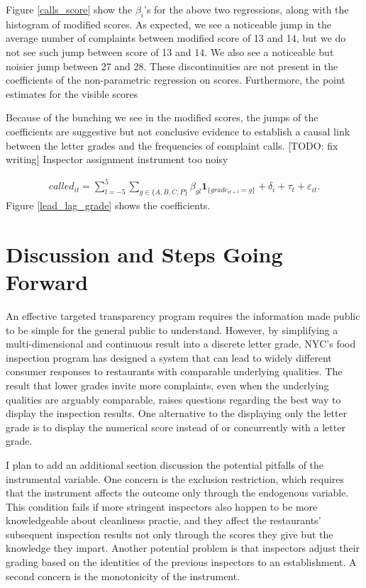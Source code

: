 \documentclass[11pt]{article}
\begin{document}
Figure \ref{calls_score} show the $\beta_i$'s for the above two regressions, along with the histogram of modified scores. As expected, we see a noticeable jump in the average number of complaints between modified score of 13 and 14, but we do not see such jump between score of 13 and 14. We also see a noticeable but noisier jump between 27 and 28. These discontinuities are not present in the coefficients of the non-parametric regression on scores. Furthermore, the point estimates for the visible scores

Because of the bunching we see in the modified scores, the jumps of the coefficients are suggestive but not conclusive evidence to establish a causal link between the letter grades and the frequencies of complaint calls. [TODO: fix writing] Inspector assignment instrument too noisy

\begin{align*}
called_{it} = \sum_{l = -5}^5 \sum_{g \in \{A, B, C, P\}  } \beta_{g l} \textbf{1}_{\{grade_{i t+l} = g  \}} + \delta_i + \tau_t + \varepsilon_{it}.
\end{align*}
Figure \ref{lead_lag_grade} shows the coefficients. 

\section{Discussion and Steps Going Forward}
\label{conclude}

An effective targeted transparency program requires the information made public to be simple for the general public to understand. However, by simplifying a multi-dimensional and continuous result into a discrete letter grade, NYC's food inspection program has designed a system that can lead to widely different consumer responses to restaurants with comparable underlying qualities. The result that lower grades invite more complaints, even when the underlying qualities are arguably comparable, raises questions regarding the best way to display the inspection results. One alternative to the displaying only the letter grade is to display the numerical score instead of or concurrently with a letter grade.

I plan to add an additional section discussion the potential pitfalls of the instrumental variable. One concern is the exclusion restriction, which requires that the instrument affects the outcome only through the endogenous variable. This condition fails if more stringent inspectors also happen to be more knowledgeable about cleanliness practie, and they affect the restaurants' subsequent inspection results not only through the scores they give but the knowledge they impart. Another potential problem is that inspectors adjust their grading based on the identities of the previous inspectors to an establishment. A second concern is the monotonicity of the instrument. 
\end{document}
